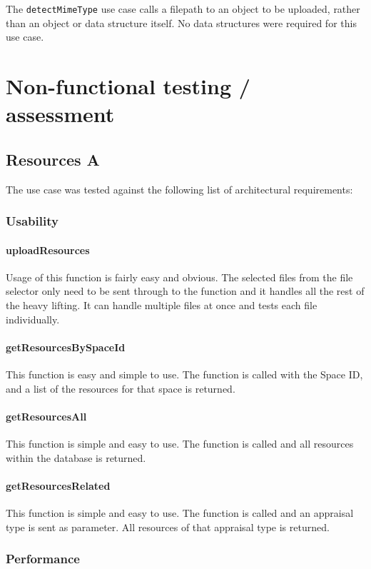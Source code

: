 \documentclass[a4paper]{article}
\begin{document}
The \texttt{detectMimeType} use case calls a filepath to an object to be uploaded, rather than an object or data structure itself. No data structures were required for this use case.

\section {Non-functional testing / assessment}
\subsection {Resources A}
The use case was tested against the following list of architectural requirements:
\subsubsection {Usability}

\paragraph{uploadResources}
Usage of this function is fairly easy and obvious. The selected files from the file selector only need to be sent through to the function and it handles all the rest of the heavy lifting. It can handle multiple files at once and tests each file individually.

\paragraph{getResourcesBySpaceId}
This function is easy and simple to use. The function is called with the Space ID, and a list of the resources for that space is returned.

\paragraph{getResourcesAll}
This function is simple and easy to use. The function is called and all resources within the database is returned.

\paragraph{getResourcesRelated}
This function is simple and easy to use. The function is called and an appraisal type is sent as parameter. All resources of that appraisal type is returned.

\subsubsection {Performance}
\end{document}

